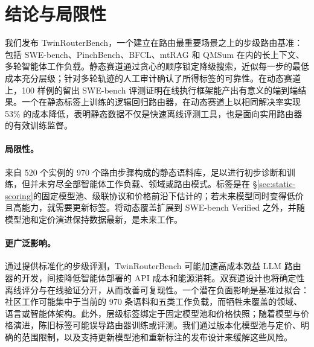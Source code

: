 \section{结论与局限性}
\label{sec:conclusion}

我们发布 TwinRouterBench，一个建立在路由最重要场景之上的步级路由基准：包括 SWE-bench、PinchBench、BFCL、mtRAG 和 QMSum 在内的长上下文、多轮智能体工作负载。静态赛道通过贪心的顺序锁定降级搜索，近似每一步的最低成本充分层级；针对多轮轨迹的人工审计确认了所得标签的可靠性。在动态赛道上，100 样例的留出 SWE-bench 评测证明在线执行框架能产出有意义的端到端结果。一个在静态标签上训练的逻辑回归路由器，在动态赛道上以相同解决率实现 53\% 的成本降低，表明静态数据不仅是快速离线评测工具，也是面向实用路由器的有效训练监督。

\paragraph{局限性。}\label{sec:limitations}
来自 520 个实例的 970 个路由步骤构成的静态语料库，足以进行初步诊断和训练，但并未穷尽全部智能体工作负载、领域或路由模式。标签是在 \S\ref{sec:static-scoring}的固定模型池、级联协议和价格前沿下估计的；若未来模型同时变得低价且高能力，就需要更新标签。将动态覆盖扩展到 SWE-bench Verified 之外，并随模型池和定价演进保持数据最新，是未来工作。

\paragraph{更广泛影响。}
通过提供标准化的步级评测，TwinRouterBench 可能加速高成本效益 LLM 路由器的开发，间接降低智能体部署的 API 成本和能源消耗。双赛道设计也将确定性离线评分与在线验证分开，从而改善可复现性。一个潜在负面影响是基准过拟合：社区工作可能集中于当前的 970 条语料和五类工作负载，而牺牲未覆盖的领域、语言或智能体架构。此外，层级标签绑定于固定模型池和价格快照；随着模型与价格演进，陈旧标签可能误导路由器训练或评测。我们通过版本化模型池与定价、明确的范围限制，以及支持更新模型池和重新标注的发布设计来缓解这些风险。
